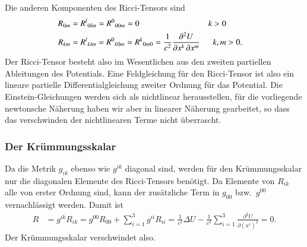 Die anderen Komponenten des Ricci-Tensors sind
\begin{align}
R_{0m}
&=
R^l\mathstrut_{0lm}
=
R^0\mathstrut_{00m}
=
0
&k>0
\notag
\\
R_{km}
&=
R^l\mathstrut_{klm}
=
R^0\mathstrut_{k0m}
=
R^k\mathstrut_{0m0}
=
\frac{1}{c^2}
\frac{\partial^2 U}{\partial x^k\,\partial x^m}
&k,m&>0.
\label{buch:kruemmung:newton:Rik}
\end{align}
Der Ricci-Tensor besteht also im Wesentlichen aus den zweiten
partiellen Ableitungen des Potentials.
Eine Feldgleichung für den Ricci-Tensor ist also ein lineare
partielle Differentialgleichung zweiter Ordnung für das Potential.
Die Einstein-Gleichungen werden sich als nichtlinear herausstellen,
für die vorliegende newtonsche Näherung haben wir aber in linearer
Näherung gearbeitet, so dass das verschwinden der nichtlinearen
Terme nicht überrascht.

%
%
\subsubsection{Der Krümmungsskalar}
Da die Metrik $g_{ik}$ ebenso wie $g^{ik}$ diagonal sind, werden
für den Krümmungsskalar nur die diagonalen Elemente des Ricci-Tensors
benötigt.
Da Elemente von $R_{ik}$ alle von erster Ordnung sind, kann der
zusätzliche Term in $g_{00}$ bzw.~$g^{00}$ vernachlässigt werden.
Damit ist 
\begin{align*}
R
&=
g^{ik}R_{ik}
=
g^{00}R_{00}
+
\sum_{i=1}^3
g^{ii}R_{ii}
=
\frac{1}{c^2}\Delta U
-
\frac{1}{c^2}
\sum_{i=1}^3
\frac{\partial^2 U}{\partial (x^i)^2}
=
0.
\end{align*}
Der Krümmungsskalar verschwindet also.
